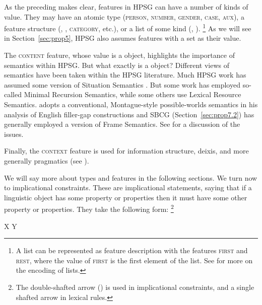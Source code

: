 \documentclass[output=paper
	        ,collection
	        ,collectionchapter
 	        ,biblatex
                ,babelshorthands
                ,newtxmath
                ,draftmode
                ,colorlinks, citecolor=brown
]{langscibook}
\begin{document}
As the preceding makes clear, features in HPSG can have a number of kinds of value. They may have an atomic type (\textsc{person}, \textsc{number}, \textsc{gender}, \textsc{case}, \textsc{aux}), a feature structure (\synsem, \local, \textsc{category}, etc.), or a list of some kind (\subj, \comps).%
%
\footnote{A list can be represented as feature description with the features \textsc{first} and \textsc{rest}, where the value of \textsc{first} is the first element of the list. See \crossrefchapterw[\page \pageref{page-list-encoding}]{formal-background} for more on the encoding of lists.}
%
As we will see in Section~\ref{sec:prop5}, HPSG also assumes features with a set as their value.

The \textsc{content} feature, whose value is a  object, highlights the importance of semantics within HPSG. But what exactly is a  object? Different views of semantics have been taken within the HPSG literature. Much HPSG work has assumed some version of Situation Semantics \citep{BP83a}. But some work has employed so-called Minimal Recursion Semantics\indexmrs \citep{CFPS2005a}, while some others use Lexical Resource Semantics\indexlrs \citep{RS2004a-u}. \citet[501]{Sag2010b} adopts a conventional, Montague-style possible-worlds semantics in his analysis of English filler-gap constructions and SBCG (Section~\ref{sec:prop7.2}) has generally employed a version of Frame Semantics. See  for a discussion of the issues.

Finally, the \textsc{context} feature is used for information structure, deixis, and more generally pragmatics (see ).

We will say more about types and features in the following sections. We turn now to implicational constraints. These are implicational statements, saying that if a linguistic object has some property or properties then it must have some other property or properties. They take the following form:%
%
\footnote{The double-shafted arrow (\isi{\impl}) is used in implicational constraints, and a single shafted arrow \isi{$\mapsto$} in lexical rules.}
%

\ea\label{ex:prop10}
X \impl Y
\z
\end{document}

